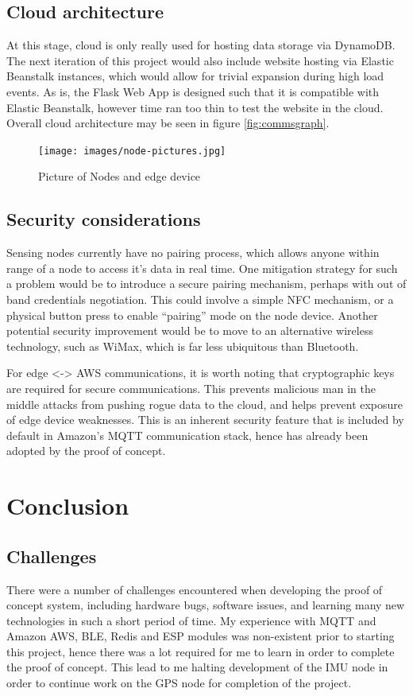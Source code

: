 \documentclass[DIV=current]{scrartcl}
\begin{document}
	\subsection{Cloud architecture}
	At this stage, cloud is only really used for hosting data storage via DynamoDB. The next iteration of this project would also include website hosting via Elastic Beanstalk instances, which would allow for trivial expansion during high load events. As is, the Flask Web App is designed such that it is compatible with Elastic Beanstalk, however time ran too thin to test the website in the cloud. Overall cloud architecture may be seen in figure \ref{fig:commsgraph}.
	
	\begin{figure}[h]
		\centering
		\texttt{[image: images/node-pictures.jpg]}
		\caption{Picture of Nodes and edge device}
		\label{fig:hwpic}
	\end{figure}
	
	\subsection{Security considerations}
	Sensing nodes currently have no pairing process, which allows anyone within range of a node to access it's data in real time. One mitigation strategy for such a problem would be to introduce a secure pairing mechanism, perhaps with out of band credentials negotiation. This could involve a simple NFC mechanism, or a physical button press to enable ``pairing'' mode on the node device. Another potential security improvement would be to move to an alternative wireless technology, such as WiMax, which is far less ubiquitous than Bluetooth.
	
	For edge <-> AWS communications, it is worth noting that cryptographic keys are required for secure communications. This prevents malicious man in the middle attacks from pushing rogue data to the cloud, and helps prevent exposure of edge device weaknesses. This is an inherent security feature that is included by default in Amazon's MQTT communication stack, hence has already been adopted by the proof of concept. 

	\section{Conclusion}
	\subsection{Challenges}
	There were a number of challenges encountered when developing the proof of concept system, including hardware bugs, software issues, and learning many new technologies in such a short period of time. My experience with MQTT and Amazon AWS, BLE, Redis and ESP modules was non-existent prior to starting this project, hence there was a lot required for me to learn in order to complete the proof of concept. This lead to me halting development of the IMU node in order to continue work on the GPS node for completion of the project.
	
\end{document}
